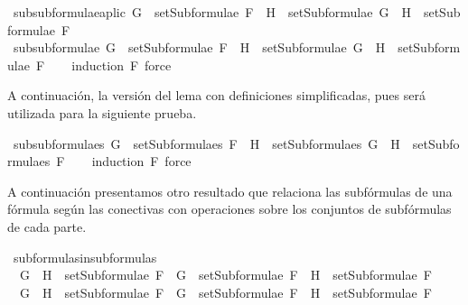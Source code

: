 \begin{isabellebody}
\isanewline
{}\isamarkupfalse%
\ subsubformulae{\isacharunderscore}aplic{\isacharcolon}\ {\isachardoublequoteopen}G\ {\isasymin}\ setSubformulae\ F\ {\isasymLongrightarrow}\ H\ {\isasymin}\ setSubformulae\ G\ {\isasymLongrightarrow}\ H\ {\isasymin}\ setSubformulae\ F{\isachardoublequoteclose}\isanewline
%
\isadelimproof
\ \ %
\endisadelimproof
%
\isatagproof
{}\isamarkupfalse%
%
\endisatagproof
{\isafoldproof}%
%
\isadelimproof
\isanewline
%
\endisadelimproof
\ \ \isanewline
{}\isamarkupfalse%
\ subsubformulae{\isacharcolon}\ {\isachardoublequoteopen}G\ {\isasymin}\ setSubformulae\ F\ {\isasymLongrightarrow}\ H\ {\isasymin}\ setSubformulae\ G\ {\isasymLongrightarrow}\ H\ {\isasymin}\ setSubformulae\ F{\isachardoublequoteclose}\isanewline
%
\isadelimproof
\ \ %
\endisadelimproof
%
\isatagproof
{}\isamarkupfalse%
\ {\isacharparenleft}induction\ F{\isacharsemicolon}\ force{\isacharparenright}%
\endisatagproof
{\isafoldproof}%
%
\isadelimproof
%
\endisadelimproof
%
\begin{isamarkuptext}%
A continuación, la versión del lema con definiciones simplificadas, pues será utilizada para
la siguiente prueba.%
\end{isamarkuptext}\isamarkuptrue%
\isamarkupfalse%
\ subsubformulae{\isacharunderscore}s{\isacharcolon}\ {\isachardoublequoteopen}G\ {\isasymin}\ setSubformulae{\isacharunderscore}s\ F\ {\isasymLongrightarrow}\ H\ {\isasymin}\ setSubformulae{\isacharunderscore}s\ G\ {\isasymLongrightarrow}\ H\ {\isasymin}\ setSubformulae{\isacharunderscore}s\ F{\isachardoublequoteclose}\isanewline
%
\isadelimproof
\ \ %
\endisadelimproof
%
\isatagproof
{}\isamarkupfalse%
\ {\isacharparenleft}induction\ F{\isacharsemicolon}\ force{\isacharparenright}%
\endisatagproof
{\isafoldproof}%
%
\isadelimproof
%
\endisadelimproof
%
\begin{isamarkuptext}%
A continuación presentamos otro resultado que relaciona las subfórmulas de una fórmula según 
las conectivas con operaciones sobre los conjuntos de subfórmulas de cada parte.%
\end{isamarkuptext}\isamarkuptrue%
\isamarkupfalse%
\ subformulas{\isacharunderscore}in{\isacharunderscore}subformulas{\isacharcolon}\isanewline
\ \ {\isachardoublequoteopen}G\ \isactrlbold {\isasymand}\ H\ {\isasymin}\ setSubformulae\ F\ {\isasymLongrightarrow}\ G\ {\isasymin}\ setSubformulae\ F\ {\isasymand}\ H\ {\isasymin}\ setSubformulae\ F{\isachardoublequoteclose}\isanewline
\ \ {\isachardoublequoteopen}G\ \isactrlbold {\isasymor}\ H\ {\isasymin}\ setSubformulae\ F\ {\isasymLongrightarrow}\ G\ {\isasymin}\ setSubformulae\ F\ {\isasymand}\ H\ {\isasymin}\ setSubformulae\ F{\isachardoublequoteclose}\isanewline

\end{isabellebody}
